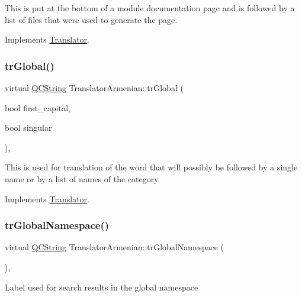 This is put at the bottom of a module documentation page and is followed by a list of files that were used to generate the page. 

Implements \mbox{\hyperlink{class_translator}{Translator}}.

\mbox{\label{class_translator_armenian_a794c57a77eb7350da6eeefbac77bd595}} 
\subsubsection{\texorpdfstring{trGlobal()}{trGlobal()}}
{\footnotesize\ttfamily virtual \mbox{\hyperlink{class_q_c_string}{Q\+C\+String}} Translator\+Armenian\+::tr\+Global (\begin{DoxyParamCaption}\item[{bool}]{first\+\_\+capital,  }\item[{bool}]{singular }\end{DoxyParamCaption})\hspace{0.3cm}{\ttfamily [inline]}, {\ttfamily [virtual]}}

This is used for translation of the word that will possibly be followed by a single name or by a list of names of the category. 

Implements \mbox{\hyperlink{class_translator}{Translator}}.

\mbox{\label{class_translator_armenian_a718905c6683f767993fb42ff2fb86107}} 
\subsubsection{\texorpdfstring{trGlobalNamespace()}{trGlobalNamespace()}}
{\footnotesize\ttfamily virtual \mbox{\hyperlink{class_q_c_string}{Q\+C\+String}} Translator\+Armenian\+::tr\+Global\+Namespace (\begin{DoxyParamCaption}{ }\end{DoxyParamCaption})\hspace{0.3cm}{\ttfamily [inline]}, {\ttfamily [virtual]}}

Label used for search results in the global namespace 

